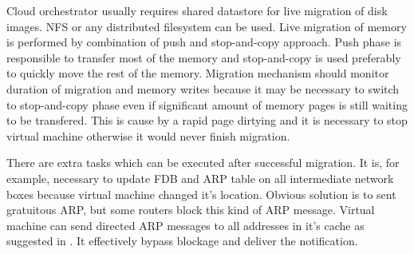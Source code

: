 Cloud orchestrator usually requires shared datastore for live migration of disk images. \Ac{NFS} or any distributed filesystem can be used. Live migration of 
memory is performed by combination of push and stop-and-copy approach. Push phase is responsible to transfer most of the memory and stop-and-copy is used preferably to quickly move the rest of the memory. Migration mechanism should monitor duration of migration and memory writes because it may be necessary to switch to stop-and-copy phase even if significant amount of memory pages is still waiting to be transfered. This is cause by a rapid page dirtying and it is necessary to stop virtual machine otherwise it would never finish migration.


There are extra tasks which can be executed after successful migration. It is, for example, necessary to update \Ac{FDB} and \Ac{ARP} table on all intermediate network boxes because virtual machine changed it's location. Obvious solution is to sent gratuitous \Ac{ARP}, but some routers block this kind of \Ac{ARP} message. Virtual machine can send directed \Ac{ARP} messages to all addresses in it's cache as suggested in \cite{live-migration-of-vms}. It effectively bypass blockage and deliver the notification.

